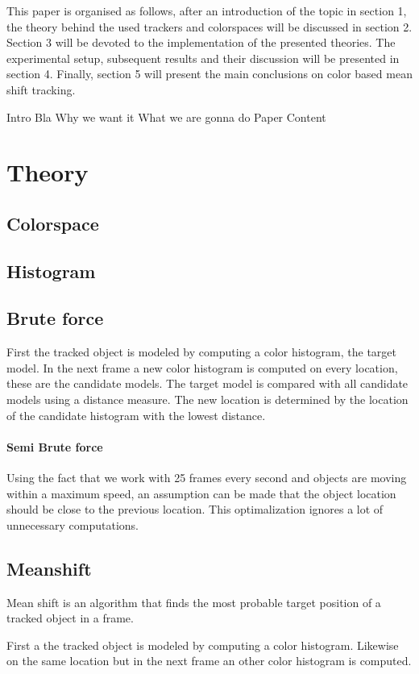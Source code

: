 \documentclass[a4paper,11pt]{article}
\begin{document}
This paper is organised as follows, after an introduction of the topic in section 1, the theory behind the used trackers and colorspaces will be discussed in section 2.
Section 3 will be devoted to the implementation of the presented theories. The experimental setup, subsequent results and their discussion will be presented in section 4. 
Finally, section 5 will present the main conclusions on color based mean shift tracking.

Intro Bla
Why we want it
What we are gonna do
Paper Content
\section{Theory}
	\subsection{Colorspace}
	\subsection{Histogram}

	\subsection{Brute force}
		First the tracked object is modeled by computing a color histogram, the
		target model.
		In the next frame a new color histogram is computed on every location,
		these are the candidate models.
		The target model is compared with all candidate models using a distance
		measure. The new location is determined by the location of the candidate
		histogram with the lowest distance.
		
		\paragraph{Semi Brute force}
		Using the fact that we work with 25 frames every second and objects are moving
		within a maximum speed, an assumption can be made that the object
		location should be close to the previous location. This optimalization
		ignores a lot of unnecessary computations.

	
	\subsection{Meanshift}
	Mean shift is an algorithm that finds the most probable target position of a
	tracked object in a frame.

	First a the tracked object is modeled by computing a color histogram.
	Likewise on the same location but in the next frame an other color histogram is
	computed.
\end{document}
